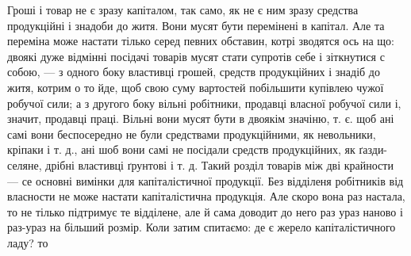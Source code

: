 Гроші і товар не є зразу капіталом, так само, як не
є ним зразу средства продукційні і знадоби до житя. Вони
мусят бути перемінені в капітал. Але та переміна може настати
тілько серед певних обставин, котрі зводятся ось на
що: двоякі дуже відмінні посідачі товарів мусят стати супротів
себе і зіткнутися с собою, — з одного боку властивці
грошей, средств продукційних і знадіб до житя, котрим
о то йде, щоб свою суму вартостей побільшити купівлею
чужої робучої сили; а з другого боку вільні робітники, продавці
власної робучої сили і, значит, продавці праці.
Вільні вони мусят бути в двоякім значіню, т. є. щоб ані
самі вони беспосередно не були средствами продукційними,
як невольники, кріпаки і т. д., ані шоб вони самі не посідали
средств продукційних, як ґазди-селяне, дрібні властивці
ґрунтові і т. д. Такий розділ товарів між дві крайности
— се основні вимінки для капіталістичної продукції.
Без відділеня робітників від власности не може настати
капіталістична продукція. Але скоро вона раз настала, то
не тілько підтримує те відділене, але й сама доводит до
него раз ураз наново і раз-ураз на більший розмір. Коли
затим спитаємо: де є жерело капіталістичного ладу? то
\parbreak{}
